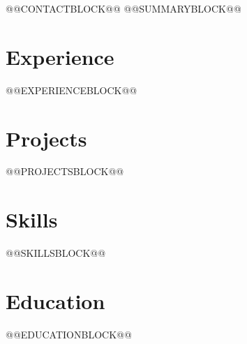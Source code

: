 \documentclass[10pt,letterpaper]{article}
\begin{document}
@@CONTACTBLOCK@@
@@SUMMARYBLOCK@@
\section{Experience}
@@EXPERIENCEBLOCK@@
\section{Projects}
@@PROJECTSBLOCK@@
\section{Skills}
@@SKILLSBLOCK@@
\section{Education}
@@EDUCATIONBLOCK@@
\end{document}
